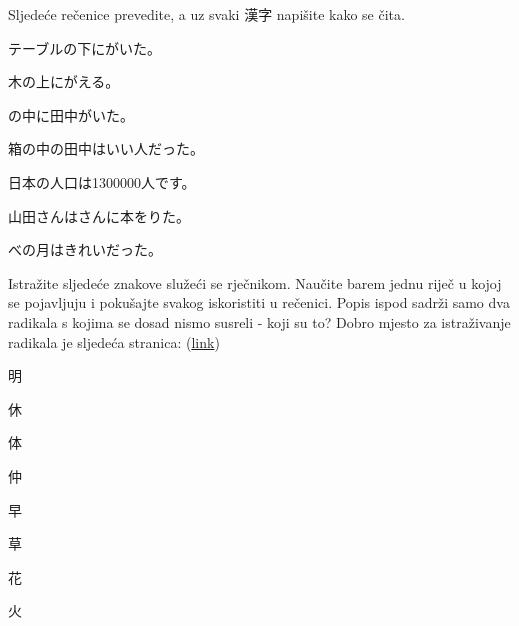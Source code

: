 
\author{Tomislav Mamić}

	
	\begin{mondai}{Sljedeće rečenice prevedite, a uz svaki 漢字 napišite kako se čita.}
		\item テーブルの下にがいた。
		\item 木の上にがえる。
		\item {}の中に田中がいた。
		\item 箱の中の田中はいい人だった。
		\item 日本の人口は1300000人です。
		\item 山田さんはさんに本をりた。
		\item {}べの月はきれいだった。
	\end{mondai}

	\begin{mondai}{Istražite sljedeće znakove služeći se rječnikom. Naučite barem jednu riječ u kojoj se pojavljuju i pokušajte svakog iskoristiti u rečenici. Popis ispod sadrži samo dva radikala s kojima se dosad nismo susreli - koji su to? Dobro mjesto za istraživanje radikala je sljedeća stranica: (\href{https://kanjialive.com/214-traditional-kanji-radicals/}{link})}
		\item 明
		\item 休
		\item 体
		\item 仲
		\item 早
		\item 草
		\item 花
		\item 火
	\end{mondai}
